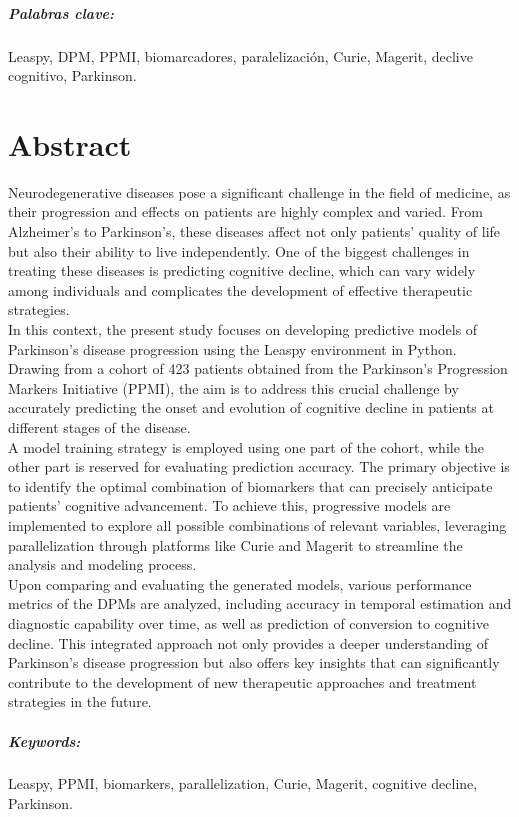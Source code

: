 \paragraph{Palabras clave:} Leaspy, DPM, PPMI, biomarcadores, paralelización, Curie, Magerit, declive cognitivo, Parkinson.

\chapter{Abstract}

Neurodegenerative diseases pose a significant challenge in the field of medicine, as their progression and effects on patients are highly complex and varied. From Alzheimer's to Parkinson's, these diseases affect not only patients' quality of life but also their ability to live independently. One of the biggest challenges in treating these diseases is predicting cognitive decline, which can vary widely among individuals and complicates the development of effective therapeutic strategies.\\

In this context, the present study focuses on developing predictive models of Parkinson's disease progression using the Leaspy environment in Python. Drawing from a cohort of 423 patients obtained from the Parkinson's Progression Markers Initiative (PPMI), the aim is to address this crucial challenge by accurately predicting the onset and evolution of cognitive decline in patients at different stages of the disease.\\

A model training strategy is employed using one part of the cohort, while the other part is reserved for evaluating prediction accuracy. The primary objective is to identify the optimal combination of biomarkers that can precisely anticipate patients' cognitive advancement. To achieve this, progressive models are implemented to explore all possible combinations of relevant variables, leveraging parallelization through platforms like Curie and Magerit to streamline the analysis and modeling process.\\

Upon comparing and evaluating the generated models, various performance metrics of the DPMs are analyzed, including accuracy in temporal estimation and diagnostic capability over time, as well as prediction of conversion to cognitive decline. This integrated approach not only provides a deeper understanding of Parkinson's disease progression but also offers key insights that can significantly contribute to the development of new therapeutic approaches and treatment strategies in the future.

\paragraph{Keywords:} Leaspy, PPMI, biomarkers, parallelization, Curie, Magerit, cognitive decline, Parkinson.
